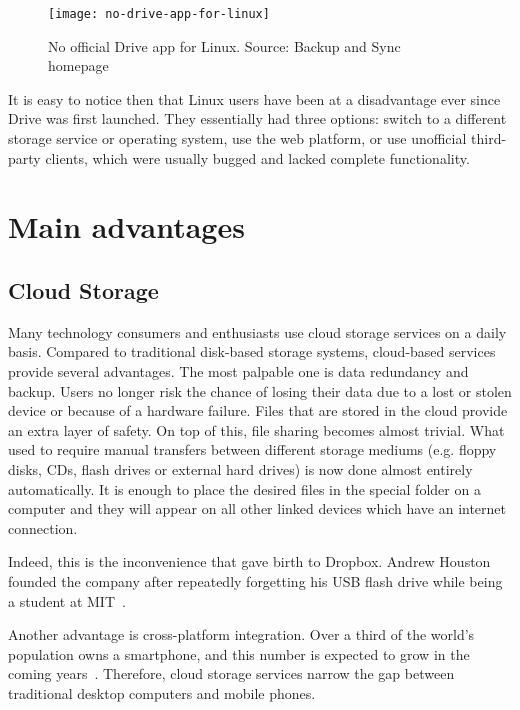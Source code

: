 \begin{figure}[bpt]
\caption{No official Drive app for Linux. Source: Backup and Sync homepage~\cite{google_drive_ui_updates}}
\label{fig:no-drive-app-for-linux}
\centering
\texttt{[image: no-drive-app-for-linux]}
\end{figure}

It is easy to notice then that Linux users have been at a disadvantage ever since Drive was first launched. They essentially had three options: switch to a different storage service or operating system, use the web platform, or use unofficial third-party clients, which were usually bugged and lacked complete functionality.

\section{Main advantages}

\subsection{Cloud Storage}

Many technology consumers and enthusiasts use cloud storage services on a daily basis. Compared to traditional disk-based storage systems, cloud-based services provide several advantages. The most palpable one is data redundancy and backup. Users no longer risk the chance of losing their data due to a lost or stolen device or because of a hardware failure. Files that are stored in the cloud provide an extra layer of safety. On top of this, file sharing becomes almost trivial. What used to require manual transfers between different storage mediums (e.g. floppy disks, CDs, flash drives or external hard drives) is now done almost entirely automatically. It is enough to place the desired files in the special folder on a computer and they will appear on all other linked devices which have an internet connection.

Indeed, this is the inconvenience that gave birth to Dropbox. Andrew Houston founded the company after repeatedly forgetting his USB flash drive while being a student at MIT~\cite{how_the_habit_of_forgetting}.

Another advantage is cross-platform integration. Over a third of the world's population owns a smartphone, and this number is expected to grow in the coming years~\cite{smartphone_ownership_usage_and_penetration_by_country}. Therefore, cloud storage services narrow the gap between traditional desktop computers and mobile phones.

